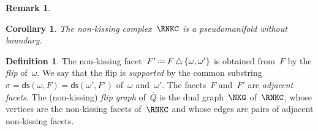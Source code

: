 \documentclass{amsart}
\newtheorem{corollary}[theorem]{Corollary}
\theoremstyle{definition}
\newtheorem{definition}[theorem]{Definition}
\newtheorem{remark}[theorem]{Remark}
\newcommand{\ssm}{\smallsetminus} %
\newcommand{\symdif}{\,\triangle\,} %
\newcommand{\eqdef}{\mbox{\,\raisebox{0.2ex}{\scriptsize\ensuremath{\mathrm:}}\ensuremath{=}\,}} %
\newcommand{\darkblue}{\color{darkblue}} %
\newcommand{\defn}[1]{\textsl{\darkblue #1}} %
\newcommand{\distinguishedWalk}[2]{\mathsf{dw}(#1,#2)} %
\newcommand{\distinguishedString}[2]{\mathsf{ds}(#1,#2)} %
\begin{document}
\begin{remark}
\end{remark}


\begin{corollary}
The non-kissing complex~$\RNKC$ is a pseudomanifold without boundary.
\end{corollary}

\begin{definition}
\label{def:flip}
The non-kissing facet~$F' \eqdef F \symdif \{\omega, \omega'\}$ is obtained from~$F$ by the \defn{flip} of~$\omega$.
We say that the flip is \defn{supported} by the common substring~$\sigma = \distinguishedString{\omega}{F} = \distinguishedString{\omega'}{F'}$ of~$\omega$ and~$\omega'$.
The facets~$F$ and~$F'$ are \defn{adjacent facets}.
The (non-kissing) \defn{flip graph} of~$\bar Q$ is the dual graph~$\NKG$ of~$\RNKC$, whose vertices are the non-kissing facets of~$\RNKC$ and whose edges are pairs of adjacent non-kissing facets.
\end{definition}
\end{document}
